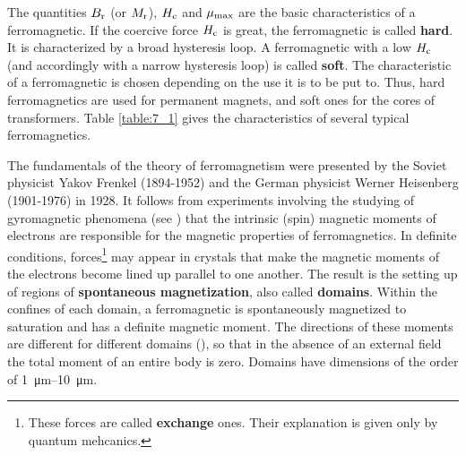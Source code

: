 The quantities $B_{\text{r}}$ (or $M_{\text{r}}$), $H_{\text{c}}$ and $\mu_{\text{max}}$ are the basic characteristics of a ferromagnetic.
If the coercive force $H_{\text{c}}$ is great, the ferromagnetic is called \textbf{hard}.
It is characterized by a broad hysteresis loop.
A ferromagnetic with a low $H_{\text{c}}$ (and accordingly with a narrow hysteresis loop) is called \textbf{soft}.
The characteristic of a ferromagnetic is chosen depending on the use it is to be put to.
Thus, hard ferromagnetics are used for permanent magnets, and soft ones for the cores of transformers.
Table \ref{table:7_1} gives the characteristics of several typical ferromagnetics.

\begin{table}[b]
	\renewcommand{\arraystretch}{1.2}
	\caption{}
	\vspace{-0.6cm}
	\label{table:7_1}
	\begin{center}\end{center}
\end{table}

The fundamentals of the theory of ferromagnetism were presented by the Soviet physicist Yakov Frenkel (1894-1952) and the German physicist Werner Heisenberg (1901-1976) in 1928.
It follows from experiments involving the studying of gyromagnetic phenomena (see ) that the intrinsic (spin) magnetic moments of electrons are responsible for the magnetic properties of ferromagnetics.
In definite conditions, forces\footnote{These forces are called \textbf{exchange} ones. Their explanation is given only by quantum mehcanics.} may appear in crystals that make the magnetic moments of the electrons become lined up parallel to one another.
The result is the setting up of regions of \textbf{spontaneous magnetization}, also called \textbf{domains}.
Within the confines of each domain, a ferromagnetic is spontaneously magnetized to saturation and has a definite magnetic moment.
The directions of these moments are different for different domains (), so that in the absence of an external field the total moment of an entire body is zero.
Domains have dimensions of the order of \SIrange{1}{10}{\micro\metre}.

